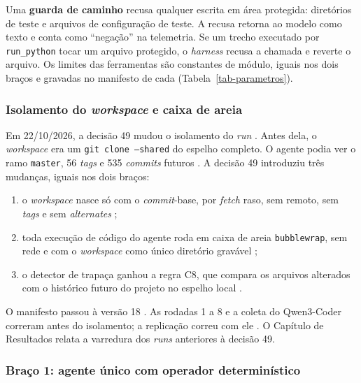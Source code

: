 Uma \textbf{guarda de caminho} recusa qualquer escrita em área protegida: diretórios de teste e arquivos de configuração de teste. A recusa retorna ao modelo como texto e conta como ``negação'' na telemetria. Se um trecho executado por \texttt{run\_python} tocar um arquivo protegido, o \textit{harness} recusa a chamada e reverte o arquivo. Os limites das ferramentas são constantes de módulo, iguais nos dois braços e gravadas no manifesto de cada  (Tabela~\ref{tab-parametros}).

\begin{novobloco}
\subsubsection{Isolamento do \textit{workspace} e caixa de areia}
\label{ssec:isolamento}

Em 22/10/2026, a decisão 49 mudou o isolamento do \textit{run} . Antes dela, o \textit{workspace} era um \texttt{git clone --shared} do espelho completo. O agente podia ver o ramo \texttt{master}, 56 \textit{tags} e 535 \textit{commits} futuros . A decisão 49 introduziu três mudanças, iguais nos dois braços:

\begin{enumerate}
    \item o \textit{workspace} nasce só com o \textit{commit}-base, por \textit{fetch} raso, sem remoto, sem \textit{tags} e sem \textit{alternates} ;
    \item toda execução de código do agente roda em caixa de areia \texttt{bubblewrap}, sem rede e com o \textit{workspace} como único diretório gravável ;
    \item o detector de trapaça ganhou a regra C8, que compara os arquivos alterados com o histórico futuro do projeto no espelho local .
\end{enumerate}

O manifesto passou à versão 18 . As rodadas 1 a 8 e a coleta do Qwen3-Coder correram antes do isolamento; a replicação correu com ele . O Capítulo de Resultados relata a varredura dos \textit{runs} anteriores à decisão 49.
\end{novobloco}

\subsubsection{Braço 1: agente único com operador determinístico}

